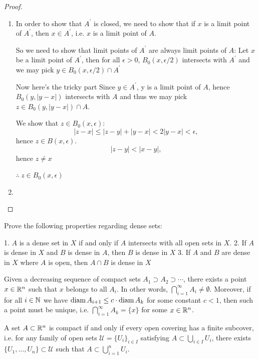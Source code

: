 \begin{proof} \
\begin{enumerate}[label=(\arabic*)]
\item In order to show that $A^\prime$ is closed, we need to show that if $x$ is a limit point of $A^\prime$, then $x\in A^\prime$, i.e. $x$ is a limit point of $A$.

So we need to show that limit points of $A^\prime$ are always limit points of $A$: 
Let $x$ be a limit point of $A^\prime$, then for all $\epsilon>0$, $B_0(x,\epsilon/2)$ intersects with $A^\prime$ and we may pick $y \in B_0(x,\epsilon/2)\cap A^\prime$

Now here's the tricky part
Since $y \in A^\prime$, y is a limit point of $A$, hence $B_0(y,|y-x|)$ intersects with $A$ and thus we may pick $z \in B_0(y,|y-x|)\cap A$.

We show that $z \in B_0(x,\epsilon)$:
\[ |z-x|\le|z-y|+|y-x|<2|y-x|<\epsilon, \]
hence $z \in B(x,\epsilon)$.
\[ |z-y|<|x-y|, \]
hence $z \neq x$

$\therefore\:z \in B_0(x,\epsilon)$

\item 
\end{enumerate}
\end{proof}

Prove the following properties regarding dense sets:

1. $A$ is a dense set in $X$ if and only if $A$ intersects with all open sets in $X$.
2. If $A$ is dense in $X$ and $B$ is dense in $A$, then $B$ is dense in $X$
3. If $A$ and $B$ are dense in $X$ where $A$ is open, then $A\cap B$ is dense in $X$


\begin{theorem}
Given a decreasing sequence of compact sets $A_1\supset A_2 \supset \cdots$, there exists a point $x\in\mathbb R^n$ such that $x$ belongs to all $A_i$. In other words, $\bigcap_{i=1}^\infty A_i\neq\emptyset$. Moreover, if for all $i\in\mathbb N$ we have $\operatorname{diam} A_{i+1}\le c\cdot\operatorname{diam} A_k$ for some constant $c<1$, then such a point must be unique, i.e. $\bigcap_{i=1}^\infty A_k=\{x\}$ for some $x\in\mathbb R^n$.
\end{theorem}

\begin{theorem}
A set $A\subset\mathbb R^n$ is compact if and only if every open covering has a finite subcover, i.e. for any family of open sets $\mathscr{U}=\{U_i\}_{i\in I}$ satisfying $A\subset\bigcup_{i\in I}U_i$, there exists $\{U_1,\dots,U_n\}\subset\mathscr{U}$ such that $A\subset\bigcup_{i=1}^n U_i$.
\end{theorem}

